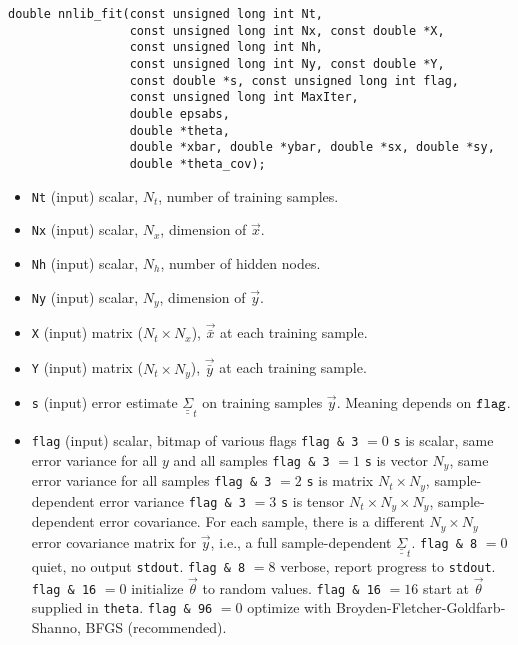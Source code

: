 \documentclass{article}    %
\newcommand{\dbul}[1]{\underline{\underline{#1}}}
\begin{document}
\begin{verbatim}
double nnlib_fit(const unsigned long int Nt, 
                 const unsigned long int Nx, const double *X, 
                 const unsigned long int Nh, 
                 const unsigned long int Ny, const double *Y, 
                 const double *s, const unsigned long int flag, 
                 const unsigned long int MaxIter, 
                 double epsabs,
                 double *theta, 
                 double *xbar, double *ybar, double *sx, double *sy,
                 double *theta_cov);
\end{verbatim}


\begin{itemize}
\item \verb|Nt| (input) scalar, $N_t$, number of training samples.
\item \verb|Nx| (input) scalar, $N_x$, dimension of $\vec{x}$.
\item \verb|Nh| (input) scalar, $N_h$, number of hidden nodes.
\item \verb|Ny| (input) scalar, $N_y$, dimension of $\vec{y}$.
\item \verb|X| (input) matrix ($N_t \times N_x$), $\vec{\bar{x}}$ at each training sample.
\item \verb|Y| (input) matrix ($N_t \times N_y$), $\vec{\bar{y}}$ at each training sample.
\item \verb|s| (input) error estimate $\dbul{\Sigma}_t$ on training samples $\vec{y}$. Meaning depends on $\verb|flag|$.
\item \verb|flag| (input) scalar, bitmap of various flags
  \subitem \verb|flag & 3| $=0$ \verb|s| is scalar, same error variance for all $y$ and all samples
  \subitem \verb|flag & 3| $=1$ \verb|s| is vector $N_y$, same error variance for all samples
  \subitem \verb|flag & 3| $=2$ \verb|s| is matrix $N_t \times N_y$, sample-dependent error variance
  \subitem \verb|flag & 3| $=3$ \verb|s| is tensor $N_t \times N_y
  \times N_y$, sample-dependent error covariance. For each sample,
  there is a different $N_y \times N_y$ error covariance matrix for
  $\vec{y}$, i.e., a full sample-dependent $\dbul{\Sigma}_t$.
  \subitem \verb|flag & 8| $=0$ quiet, no output \verb|stdout|.
  \subitem \verb|flag & 8| $=8$ verbose, report progress to \verb|stdout|.
  \subitem \verb|flag & 16| $=0$ initialize $\vec\theta$ to random values.
  \subitem \verb|flag & 16| $=16$ start at $\vec\theta$ supplied in \verb|theta|.
  \subitem \verb|flag & 96| $=0$ optimize with Broyden-Fletcher-Goldfarb-Shanno, BFGS (recommended).

\end{itemize}
\end{document}
